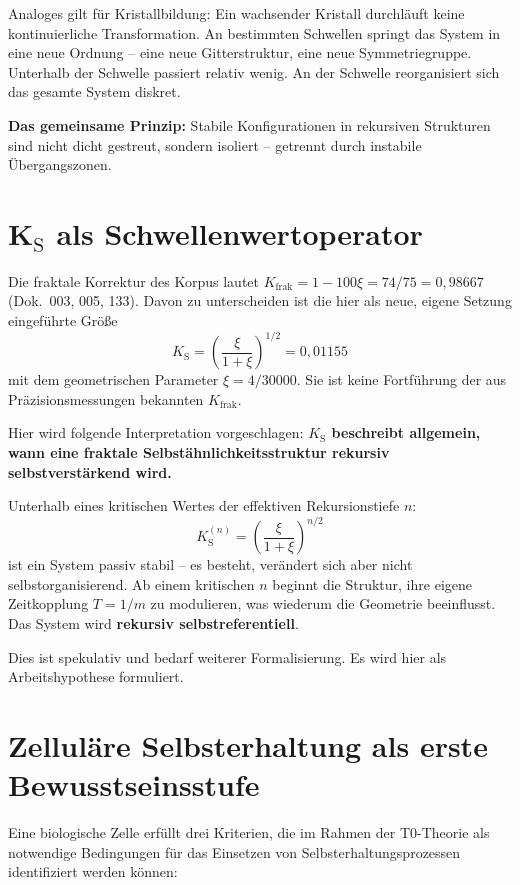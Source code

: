 	Analoges gilt für Kristallbildung: Ein wachsender Kristall durchläuft keine kontinuierliche Transformation. An bestimmten Schwellen springt das System in eine neue Ordnung -- eine neue Gitterstruktur, eine neue Symmetriegruppe. Unterhalb der Schwelle passiert relativ wenig. An der Schwelle reorganisiert sich das gesamte System diskret.
	
	\textbf{Das gemeinsame Prinzip:} Stabile Konfigurationen in rekursiven Strukturen sind nicht dicht gestreut, sondern isoliert -- getrennt durch instabile Übergangszonen.
	
	\section{K$_{\text{S}}$ als Schwellenwertoperator}
	
	Die fraktale Korrektur des Korpus lautet $K_{\text{frak}} = 1 - 100\xi = 74/75 = 0{,}98667$ (Dok.~003, 005, 133). Davon zu unterscheiden ist die hier als neue, eigene Setzung eingeführte Größe
	\begin{equation}
		K_{\text{S}} = \left(\frac{\xi}{1+\xi}\right)^{1/2} = 0{,}01155
	\end{equation}
	mit dem geometrischen Parameter $\xi = 4/30000$. Sie ist keine Fortführung der aus Präzisionsmessungen bekannten $K_{\text{frak}}$.
	
	Hier wird folgende Interpretation vorgeschlagen: \textbf{$K_{\text{S}}$ beschreibt allgemein, wann eine fraktale Selbstähnlichkeitsstruktur rekursiv selbstverstärkend wird.}
	
	Unterhalb eines kritischen Wertes der effektiven Rekursionstiefe $n$:
	\begin{equation}
		K_{\text{S}}^{(n)} = \left(\frac{\xi}{1+\xi}\right)^{n/2}
	\end{equation}
	ist ein System passiv stabil -- es besteht, verändert sich aber nicht selbstorganisierend. Ab einem kritischen $n$ beginnt die Struktur, ihre eigene Zeitkopplung $T = 1/m$ zu modulieren, was wiederum die Geometrie beeinflusst. Das System wird \textbf{rekursiv selbstreferentiell}.
	
	Dies ist spekulativ und bedarf weiterer Formalisierung. Es wird hier als Arbeitshypothese formuliert.
	
	\section{Zelluläre Selbsterhaltung als erste Bewusstseinsstufe}
	
	Eine biologische Zelle erfüllt drei Kriterien, die im Rahmen der T0-Theorie als notwendige Bedingungen für das Einsetzen von Selbsterhaltungsprozessen identifiziert werden können:
	
